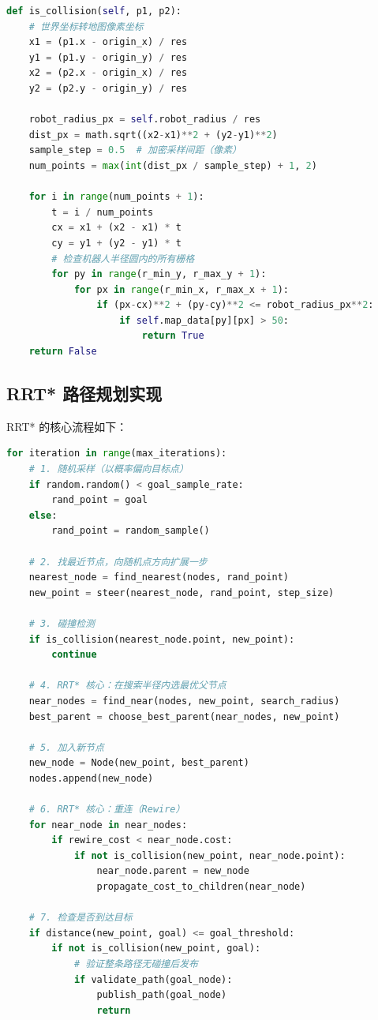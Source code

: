 \documentclass{SYSUReport}
\begin{document}
\begin{lstlisting}[language=Python, caption=碰撞检测核心逻辑（planner.py）]
def is_collision(self, p1, p2):
    # 世界坐标转地图像素坐标
    x1 = (p1.x - origin_x) / res
    y1 = (p1.y - origin_y) / res
    x2 = (p2.x - origin_x) / res
    y2 = (p2.y - origin_y) / res

    robot_radius_px = self.robot_radius / res
    dist_px = math.sqrt((x2-x1)**2 + (y2-y1)**2)
    sample_step = 0.5  # 加密采样间距（像素）
    num_points = max(int(dist_px / sample_step) + 1, 2)

    for i in range(num_points + 1):
        t = i / num_points
        cx = x1 + (x2 - x1) * t
        cy = y1 + (y2 - y1) * t
        # 检查机器人半径圆内的所有栅格
        for py in range(r_min_y, r_max_y + 1):
            for px in range(r_min_x, r_max_x + 1):
                if (px-cx)**2 + (py-cy)**2 <= robot_radius_px**2:
                    if self.map_data[py][px] > 50:
                        return True
    return False
\end{lstlisting}

\subsection{RRT* 路径规划实现}

RRT* 的核心流程如下：

\begin{lstlisting}[language=Python, caption=RRT* 主循环（planner.py）]
for iteration in range(max_iterations):
    # 1. 随机采样（以概率偏向目标点）
    if random.random() < goal_sample_rate:
        rand_point = goal
    else:
        rand_point = random_sample()

    # 2. 找最近节点，向随机点方向扩展一步
    nearest_node = find_nearest(nodes, rand_point)
    new_point = steer(nearest_node, rand_point, step_size)

    # 3. 碰撞检测
    if is_collision(nearest_node.point, new_point):
        continue

    # 4. RRT* 核心：在搜索半径内选最优父节点
    near_nodes = find_near(nodes, new_point, search_radius)
    best_parent = choose_best_parent(near_nodes, new_point)

    # 5. 加入新节点
    new_node = Node(new_point, best_parent)
    nodes.append(new_node)

    # 6. RRT* 核心：重连（Rewire）
    for near_node in near_nodes:
        if rewire_cost < near_node.cost:
            if not is_collision(new_point, near_node.point):
                near_node.parent = new_node
                propagate_cost_to_children(near_node)

    # 7. 检查是否到达目标
    if distance(new_point, goal) <= goal_threshold:
        if not is_collision(new_point, goal):
            # 验证整条路径无碰撞后发布
            if validate_path(goal_node):
                publish_path(goal_node)
                return
\end{lstlisting}
\end{document}
